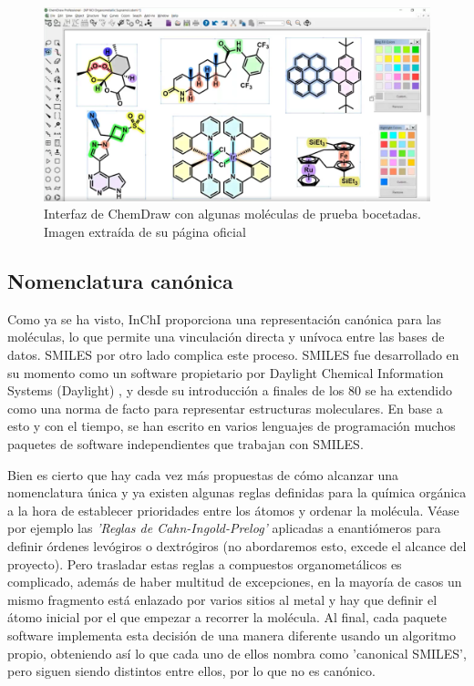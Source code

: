 \begin{figure}[h!]
    \centering
    \includegraphics[scale=0.34]{imagenes/estado_arte/chemdraw.png}
    \caption{Interfaz de ChemDraw con algunas moléculas de prueba bocetadas. Imagen extraída de su página oficial \cite{chemdraw_page}}
    \label{fig:chemdraw}
\end{figure}

\subsection{Nomenclatura canónica} \label{estado:canon}
Como ya se ha visto, InChI proporciona una representación canónica para las moléculas, lo que permite una vinculación directa y unívoca entre las bases de datos. SMILES por otro lado complica este proceso. SMILES fue desarrollado en su momento como un software propietario por Daylight Chemical Information Systems (Daylight) \cite{daylight}, y desde su introducción a finales de los 80 se ha extendido como una norma de facto para representar estructuras moleculares. En base a esto y con el tiempo, se han escrito en varios lenguajes de programación muchos paquetes de software independientes que trabajan con SMILES\cite{opensmiles}.

Bien es cierto que hay cada vez más propuestas de cómo alcanzar una nomenclatura única \cite{weininger_smiles_1989, inchi1, nextmove_software_facto_nodate, baoilleach_we_nodate, universal_smiles} y ya existen algunas reglas definidas para la química orgánica a la hora de establecer prioridades entre los átomos y ordenar la molécula. Véase por ejemplo las \emph{'Reglas de Cahn-Ingold-Prelog'} aplicadas a enantiómeros \cite{cahn_specification_1966, prelog_basic_1982, NOMENCLATURA_R_S} para definir órdenes levógiros o dextrógiros (no abordaremos esto, excede el alcance del proyecto). Pero trasladar estas reglas a compuestos organometálicos es complicado, además de haber multitud de excepciones, en la mayoría de casos un mismo fragmento está enlazado por varios sitios al metal y hay que definir el átomo inicial por el que empezar a recorrer la molécula. Al final, cada paquete software implementa esta decisión de una manera diferente usando un algoritmo propio, obteniendo así lo que cada uno de ellos nombra como 'canonical SMILES', pero siguen siendo distintos entre ellos, por lo que no es canónico.

